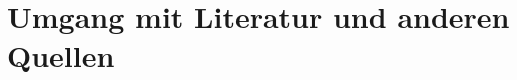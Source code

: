 \chapter[Umgang mit Literatur]{Umgang mit Literatur und anderen Quellen}
\label{cha:Literatur}


\cite{Drake1948}	%


